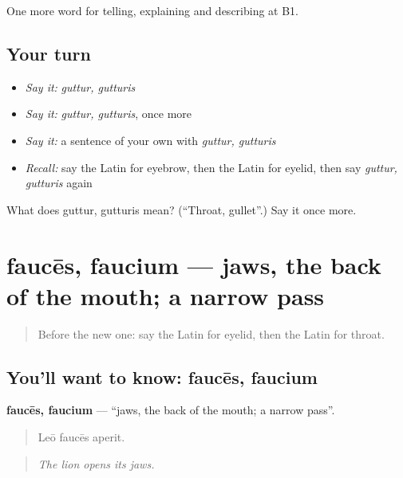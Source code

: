 \begin{grammarlens}[title={What you've built}]
One more word for telling, explaining and describing at B1.
\end{grammarlens}

\subsection*{Your turn}
\begin{itemize}
\raggedright
  \item \emph{Say it:} \emph{guttur, gutturis}
  \item \emph{Say it:} \emph{guttur, gutturis}, once more
  \item \emph{Say it:} a sentence of your own with \emph{guttur, gutturis}
  \item \emph{Recall:} say the Latin for eyebrow, then the Latin for eyelid, then say \emph{guttur, gutturis} again
\end{itemize}

\begin{tcolorbox}[breakable,colback=teal!4,colframe=teal!35!black,title={Before you move on}]
What does guttur, gutturis mean? (\textquotedblleft{}Throat, gullet\textquotedblright{}.) Say it once more.
\end{tcolorbox}
\section[faucēs, faucium]{faucēs, faucium — jaws, the back of the mouth; a narrow pass}

\label{lesson:LA-C516-fauces}



\begin{quote}
Before the new one: say the Latin for eyelid, then the Latin for throat.
\end{quote}

\subsection*{You'll want to know: faucēs, faucium}
\textbf{faucēs, faucium} — \textquotedblleft{}jaws, the back of the mouth; a narrow pass\textquotedblright{}.

\begin{quote}
Leō faucēs aperit.
\end{quote}

\begin{quote}
\emph{The lion opens its jaws.}
\end{quote}

